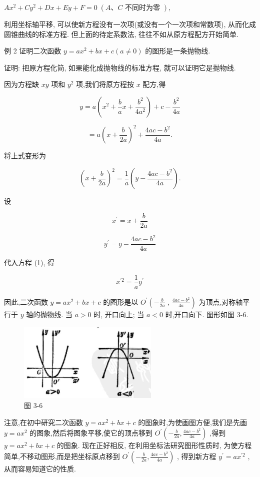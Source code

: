 \documentclass[lang=cn,newtx,12pt,scheme=chinese]{elegantbook}
\begin{document}
\(A{x}^{2} + C{y}^{2} + {Dx} + {Ey} + F = 0\;\left( {A\text{、}C\text{ 不同时为零 }}\right) ,\)

利用坐标轴平移, 可以使新方程没有一次项(或没有一个一次项和常数项), 从而化成圆锥曲线的标准方程. 但上面的待定系数法, 往往不如从原方程配方开始简单.

例 2 证明二次函数 \(y = a{x}^{2} + {bx} + c\left( {a \neq 0}\right)\) 的图形是一条抛物线.

证明: 把原方程化简, 如果能化成抛物线的标准方程, 就可以证明它是抛物线.

因为方程缺 \({xy}\) 项和 \({y}^{2}\) 项,我们将原方程按 \(x\) 配方,得

\[
  y = a\left( {{x}^{2} + \frac{b}{a}x + \frac{{b}^{2}}{4{a}^{2}}}\right) + c - \frac{{b}^{2}}{4a}
\]

\[
  = a{\left( x + \frac{b}{2a}\right) }^{2} + \frac{{4ac} - {b}^{2}}{4a}.
\]

将上式变形为

\[
    {\left( x + \frac{b}{2a}\right) }^{2} = \frac{1}{a}\left( {y - \frac{{4ac} - {b}^{2}}{4a}}\right) . \tag{1}
\]

设

\[
    {x}^{\prime } = x + \frac{b}{2a}
\]

\[
    {y}^{\prime } = y - \frac{{4ac} - {b}^{2}}{4a}
\]

代入方程 (1), 得

\[
    {x}^{\prime 2} = \frac{1}{a}{y}^{\prime }
\]

因此,二次函数 \(y = a{x}^{2} + {bx} + c\) 的图形是以 \({O}^{\prime }\left( {-\frac{b}{2a}}\right.\) , \(\left. \frac{{4ac} - {b}^{2}}{4a}\right)\) 为顶点,对称轴平行于 \(y\) 轴的抛物线. 当 \(a > 0\) 时, 开口向上; 当 \(a < 0\) 时,开口向下. 图形如图 3-6.

\begin{figure}[h]
  \centering
  \includegraphics[max width=0.6\textwidth]{images/01912cc2-ffb6-728e-9ae7-b113ff05c64b_137_787676.jpg}
  \caption{图 3-6}
\end{figure}

注意,在初中研究二次函数 \(y = a{x}^{2} + {bx} + c\) 的图象时,为使画图方便,我们是先画 \(y = a{x}^{2}\) 的图象,然后将图象平移,使它的顶点移到 \({O}^{\prime }\left( {-\frac{b}{2a},\frac{{4ac} - {b}^{2}}{4a}}\right)\) ,得到 \(y = a{x}^{2} + {bx} + c\) 的图象. 现在正好相反, 在利用坐标法研究图形性质时, 为使方程简单,不移动图形,而是把坐标原点移到 \({O}^{\prime }\left( {-\frac{b}{2a},\frac{{4ac} - {b}^{2}}{4a}}\right)\) , 得到新方程 \({y}^{\prime } = a{x}^{\prime 2}\) ,从而容易知道它的性质.
\end{document}
